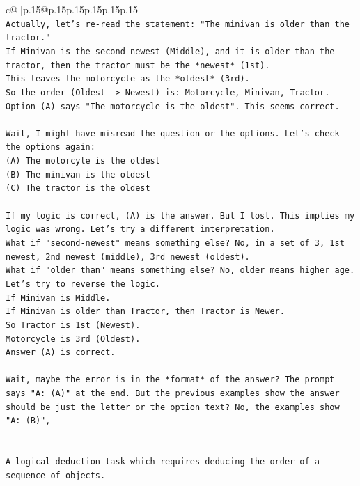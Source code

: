 \documentclass{article}
\begin{document}
{\begin{supertabular}{c@{$\;$}|p{.15\linewidth}@{}p{.15\linewidth}p{.15\linewidth}p{.15\linewidth}p{.15\linewidth}p{.15\linewidth}}
{{{\\ 
\texttt{Actually, let's re{-}read the statement: "The minivan is older than the tractor."} \\
\texttt{If Minivan is the second{-}newest (Middle), and it is older than the tractor, then the tractor must be the *newest* (1st).} \\
\texttt{This leaves the motorcycle as the *oldest* (3rd).} \\
\texttt{So the order (Oldest {-}> Newest) is: Motorcycle, Minivan, Tractor.} \\
\texttt{Option (A) says "The motorcycle is the oldest". This seems correct.} \\
\\ 
\texttt{Wait, I might have misread the question or the options. Let's check the options again:} \\
\texttt{(A) The motorcyle is the oldest} \\
\texttt{(B) The minivan is the oldest} \\
\texttt{(C) The tractor is the oldest} \\
\\ 
\texttt{If my logic is correct, (A) is the answer. But I lost. This implies my logic was wrong. Let's try a different interpretation.} \\
\texttt{What if "second{-}newest" means something else? No, in a set of 3, 1st newest, 2nd newest (middle), 3rd newest (oldest).} \\
\texttt{What if "older than" means something else? No, older means higher age.} \\
\texttt{Let's try to reverse the logic.} \\
\texttt{If Minivan is Middle.} \\
\texttt{If Minivan is older than Tractor, then Tractor is Newer.} \\
\texttt{So Tractor is 1st (Newest).} \\
\texttt{Motorcycle is 3rd (Oldest).} \\
\texttt{Answer (A) is correct.} \\
\\ 
\texttt{Wait, maybe the error is in the *format* of the answer? The prompt says "A: (A)" at the end. But the previous examples show the answer should be just the letter or the option text? No, the examples show "A: (B)",} \\
\\ 
\\ 
\texttt{A logical deduction task which requires deducing the order of a sequence of objects.} \\
}}}
\end{supertabular}}
\end{document}
